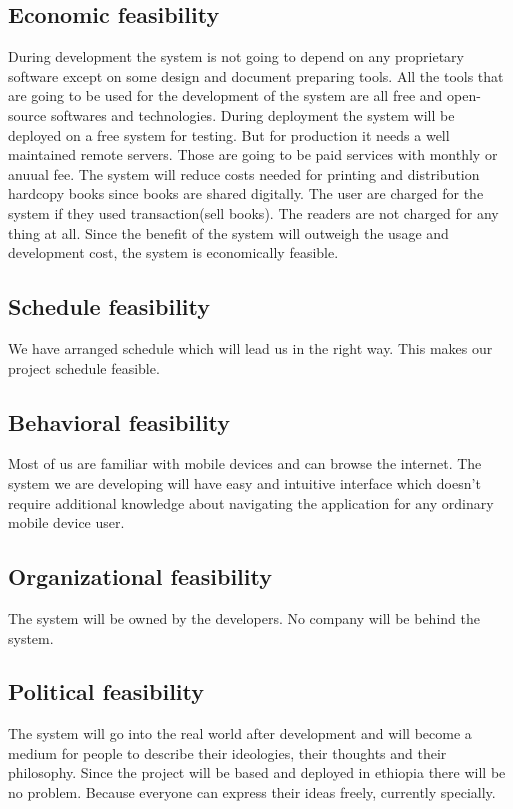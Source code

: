 	\subsection{Economic feasibility}
   During development the system is not going to depend on any proprietary software except on some design and document preparing tools. All the tools that are going to be used for the development of the system are all free and open-source softwares and technologies.
   During deployment the system will be deployed on a free system for testing. But for production it needs a well maintained remote servers. Those are going to be paid services with monthly or anuual fee. The system will reduce costs needed for printing and distribution hardcopy books since books are shared digitally. The user are charged for the system if they used transaction(sell books). The readers are not charged for any thing at all. Since the benefit of the system will outweigh the usage and development cost, the system is economically feasible.

	\subsection{Schedule feasibility}
   We have arranged schedule which will lead us in the right way. This makes our project schedule feasible.

	\subsection{Behavioral feasibility}
   Most of us are familiar with mobile devices and can browse the internet. The system we are developing will have easy and intuitive interface which doesn't require additional knowledge about navigating the application for any ordinary mobile device user.

   \subsection{Organizational feasibility}
   The system will be owned by the developers. No company will be behind the system.

   \subsection{Political feasibility}
   The system will go into the real world after development and will become a medium for people to describe their ideologies, their thoughts and their philosophy. Since the project will be based and deployed in ethiopia there will be no problem. Because everyone can express their ideas freely, currently specially.
